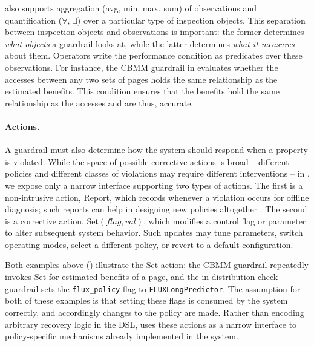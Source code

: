 \lang also supports aggregation ({\sf avg}, {\sf min}, {\sf max}, {\sf sum}) of observations and quantification ($\forall$, $\exists$) over a particular type of inspection objects.
This separation between inspection objects and observations is important: the former determines \emph{what objects} a guardrail looks at, while the latter determines \emph{what it measures} about them.
Operators write the performance condition as predicates over these observations.
For instance, the CBMM guardrail in  evaluates whether the accesses between any two sets of pages holds the same relationship as the estimated benefits. This condition ensures that the benefits hold the same relationship as the accesses and are thus, accurate. 

\paragraph{Actions.}
A guardrail must also determine how the system should respond when a property is violated.
While the space of possible corrective actions is broad -- different policies and different classes of violations may require different interventions -- in \lang, we expose only a narrow interface supporting two types of actions.
The first is a non-intrusive action, {\sf Report}, which records whenever a violation occurs for offline diagnosis; such reports can help in designing new policies altogether .
The second is a corrective action, {\sf Set}$(flag, val)$, which modifies a control flag or parameter to alter subsequent system behavior.
Such updates may tune parameters, switch operating modes, select a different policy, or revert to a default configuration.

Both examples above () illustrate the {\sf Set} action: the CBMM guardrail repeatedly invokes {\sf Set} for estimated benefits of a page, and the in-distribution check guardrail sets the {\tt flux\_policy} flag to {\tt FLUXLongPredictor}.
The assumption for both of these examples is that setting these flags is consumed by the system correctly, and accordingly changes to the policy are made.
Rather than encoding arbitrary recovery logic in the DSL, \lang uses these actions as a narrow interface to policy-specific mechanisms already implemented in the system.

